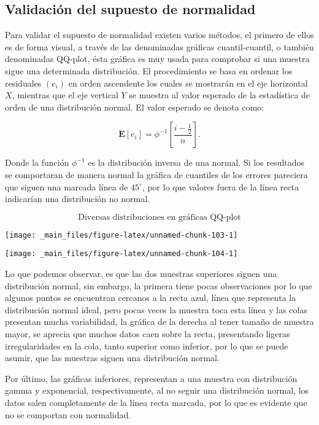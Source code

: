 \documentclass[
  a4paper,
  oneside,
  openany]{book}
\begin{document}
\hypertarget{validaciuxf3n-del-supuesto-de-normalidad}{%
\subsection{Validación del supuesto de normalidad}\label{validaciuxf3n-del-supuesto-de-normalidad}}

Para validar el supuesto de normalidad existen varios métodos, el primero de ellos es de forma visual, a través de las denominadas gráficas cuantil-cuantil, o también denominadas QQ-plot, ésta gráfica es muy usada para comprobar si una muestra sigue una determinada distribución. El procedimiento se basa en ordenar los residuales \((e_{i})\) en orden ascendente los cuales se mostrarán en el eje horizontal \(X\), mientras que el eje vertical \(Y\) se muestra al valor esperado de la estadística de orden de una distribución normal.
El valor esperado se denota como:

\[\mathbf{E}[e_{i}]=\phi^{-1}\left[\frac{i-\frac{1}{2}}{n}\right].\]

Donde la función \(\phi^{-1}\) es la distribución inversa de una normal. Si los resultados se comportaran de manera normal la gráfica de cuantiles de los errores pareciera que siguen una marcada línea de \(45^\circ\), por lo que valores fuera de la línea recta indicarían una distribución no normal.

\[\mbox{Diversas distribuciones en gráficas QQ-plot}\]

\begin{center}\texttt{[image: \_main\_files/figure-latex/unnamed-chunk-103-1]} \end{center}

\begin{center}\texttt{[image: \_main\_files/figure-latex/unnamed-chunk-104-1]} \end{center}

Lo que podemos observar, es que las dos muestras superiores siguen una distribución normal, sin embargo, la primera tiene pocas observaciones por lo que algunos puntos se encuentran cercanos a la recta azul, línea que representa la distribución normal ideal, pero pocas veces la muestra toca esta línea y las colas presentan mucha variabilidad, la gráfica de la derecha al tener tamaño de muestra mayor, se aprecia que muchos datos caen sobre la recta, presentando ligeras irregularidades en la cola, tanto superior como inferior, por lo que se puede asumir, que las muestras siguen una distribución normal.

Por último, las gráficas inferiores, representan a una muestra con distribución gamma y exponencial, respectivamente, al no seguir una distribución normal, los datos salen completamente de la línea recta marcada, por lo que es evidente que no se comportan con normalidad.
\end{document}

